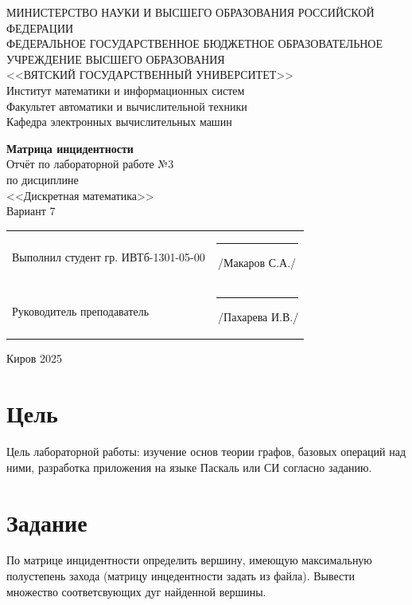 \documentclass[a4paper,14pt]{extarticle}
\begin{document}
  \newpage\thispagestyle{empty}
  \begin{center}
    \MakeUppercase{
      Министерство науки и высшего образования Российской Федерации\\
      Федеральное государственное бюджетное образовательное учреждение высшего образования\\
      <<Вятский Государственный Университет>>\\
    }
    Институт математики и информационных систем\\
    Факультет автоматики и вычислительной техники\\
    Кафедра электронных вычислительных машин
  \end{center}
  \vfill

  \begin{center}
    \textbf{Матрица инцидентности}\\
    Отчёт по лабораторной работе №3\\
    по дисциплине\\
    <<Дискретная математика>>\\
    Вариант 7
  \end{center}
  \vfill

  \noindent
  \begin{tabular}{ll}
    Выполнил студент гр. ИВТб-1301-05-00 \hspace{5mm} &
    \rule[-1mm]{25mm}{0.10mm}\,/Макаров С.А./\\
    
    Руководитель преподаватель & \rule[-1mm]{25mm}{0.10mm}\,/Пахарева И.В./\\
  \end{tabular}

  \vfill
  \begin{center}
    Киров 2025
  \end{center}

  \newpage
  \section*{\hspace{12.5mm}Цель}
  Цель лабораторной работы: изучение основ теории графов, базовых операций над ними, разработка приложения на языке Паскаль или СИ согласно заданию.

  \section*{\hspace{12.5mm}Задание}
  По матрице инцидентности определить вершину, имеющую максимальную полустепень захода (матрицу инцедентности задать из файла). Вывести множество соответсвующих дуг найденной вершины.
\end{document}
